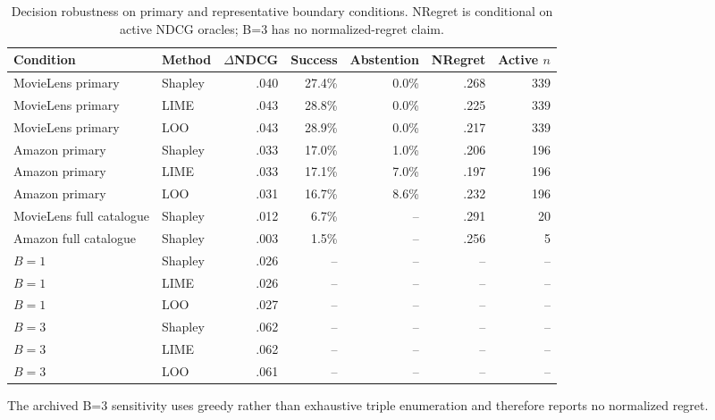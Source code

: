 \begin{table}[ht]
\centering\scriptsize
\caption{Decision robustness on primary and representative boundary conditions. NRegret is conditional on active NDCG oracles; B=3 has no normalized-regret claim.}
\label{tab:app-decisions}
\setlength{\tabcolsep}{3pt}
\begin{tabular}{@{}p{}p{}rrrrr@{}}
\toprule
Condition & Method & $\Delta$NDCG & Success & Abstention & NRegret & Active $n$ \\
\midrule
MovieLens primary & Shapley & .040 & 27.4\% & 0.0\% & .268 & 339 \\
MovieLens primary & LIME & .043 & 28.8\% & 0.0\% & .225 & 339 \\
MovieLens primary & LOO & .043 & 28.9\% & 0.0\% & .217 & 339 \\
Amazon primary & Shapley & .033 & 17.0\% & 1.0\% & .206 & 196 \\
Amazon primary & LIME & .033 & 17.1\% & 7.0\% & .197 & 196 \\
Amazon primary & LOO & .031 & 16.7\% & 8.6\% & .232 & 196 \\
MovieLens full catalogue & Shapley & .012 & 6.7\% & -- & .291 & 20 \\
Amazon full catalogue & Shapley & .003 & 1.5\% & -- & .256 & 5 \\
\midrule
$B=1$ & Shapley & .026 & -- & -- & -- & -- \\
$B=1$ & LIME & .026 & -- & -- & -- & -- \\
$B=1$ & LOO & .027 & -- & -- & -- & -- \\
$B=3$ & Shapley & .062 & -- & -- & -- & -- \\
$B=3$ & LIME & .062 & -- & -- & -- & -- \\
$B=3$ & LOO & .061 & -- & -- & -- & -- \\
\bottomrule
\end{tabular}
\end{table}

\noindent The archived B=3 sensitivity uses greedy rather than exhaustive triple enumeration and therefore reports no normalized regret.
